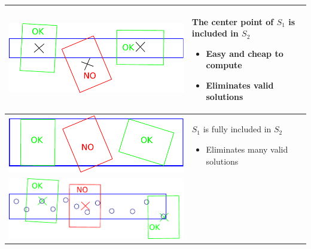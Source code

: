 \begin{table}[ht!]
  \centering
  \begin{tabular}{c m{8cm}}
    \toprule
    \begin{minipage}{.4\textwidth}
      \includegraphics[width=0.9\linewidth]{contact1.pdf}
    \end{minipage}
    &
    The center point of $S_1$ is included
    in $S_2$~\cite{hauser:humanoid:2005}
    \begin{itemize}
      \item Easy and cheap to compute
      \item Eliminates valid solutions
    \end{itemize}
    \\ \midrule
    \begin{minipage}{.4\textwidth}
      \includegraphics[width=0.8\linewidth]{contact2.pdf}
    \end{minipage}
    &
    $S_1$ is fully included in $S_2$~\cite{bouyarmane:ar:2012}
    \begin{itemize}
      \item Eliminates many valid solutions
    \end{itemize}
    \\ \midrule
    \begin{minipage}{.4\textwidth}
      \includegraphics[width=\linewidth]{contact3.pdf}

\end{minipage}
\end{tabular}
\end{table}
